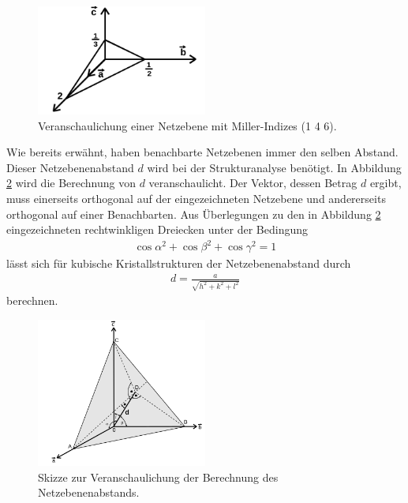 \begin{figure}[hhh]
\centering
\includegraphics[width=0.5\textwidth]{abbildungen/miller_ind.png}
\caption{Veranschaulichung einer Netzebene mit Miller-Indizes (1 4 6).\cite{sample}}
\label{fig:miller_ind}
\end{figure}

Wie bereits erwähnt, haben benachbarte Netzebenen immer
den selben Abstand. Dieser Netzebenenabstand $d$ wird bei der
Strukturanalyse benötigt. In Abbildung \ref{fig:miller_abstand} wird
die Berechnung von $d$ veranschaulicht. Der Vektor, dessen Betrag $d$ ergibt,
muss einerseits orthogonal auf der eingezeichneten Netzebene und andererseits orthogonal
auf einer Benachbarten. Aus Überlegungen zu den in Abbildung \ref{fig:miller_abstand}
eingezeichneten rechtwinkligen Dreiecken unter der Bedingung
\begin{align}
\label{eqn:4}
\cos\alpha^2 + \cos\beta^2 + \cos\gamma^2 = 1
\end{align}
lässt sich für kubische Kristallstrukturen der Netzebenenabstand
durch
\begin{align}
\label{eqn:5}
d = \frac{a}{\sqrt{h^2 + k^2 + l^2}}
\end{align}
berechnen.

\begin{figure}[hhh]
\centering
\includegraphics[width=0.5\textwidth]{abbildungen/miller_dist.png}
\caption{Skizze zur Veranschaulichung der Berechnung des Netzebenenabstands.\cite{sample}}
\label{fig:miller_abstand}
\end{figure}

